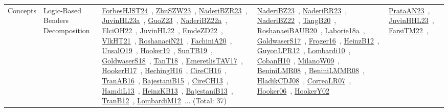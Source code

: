 {\begin{longtable}{lp{3cm}>{\raggedright\arraybackslash}p{6cm}>{\raggedright\arraybackslash}p{6cm}>{\raggedright\arraybackslash}p{8cm}}
Concepts & Logic-Based Benders Decomposition & \href{../works/ForbesHJST24.pdf}{ForbesHJST24}~\cite{ForbesHJST24}, \href{../works/ZhuSZW23.pdf}{ZhuSZW23}~\cite{ZhuSZW23}, \href{../works/NaderiBZR23.pdf}{NaderiBZR23}~\cite{NaderiBZR23}, \href{../works/JuvinHL23a.pdf}{JuvinHL23a}~\cite{JuvinHL23a}, \href{../works/GuoZ23.pdf}{GuoZ23}~\cite{GuoZ23}, \href{../works/NaderiBZ22a.pdf}{NaderiBZ22a}~\cite{NaderiBZ22a}, \href{../works/ElciOH22.pdf}{ElciOH22}~\cite{ElciOH22}, \href{../works/JuvinHL22.pdf}{JuvinHL22}~\cite{JuvinHL22}, \href{../works/EmdeZD22.pdf}{EmdeZD22}~\cite{EmdeZD22}, \href{../works/VlkHT21.pdf}{VlkHT21}~\cite{VlkHT21}, \href{../works/RoshanaeiN21.pdf}{RoshanaeiN21}~\cite{RoshanaeiN21}, \href{../works/FachiniA20.pdf}{FachiniA20}~\cite{FachiniA20}, \href{../works/UnsalO19.pdf}{UnsalO19}~\cite{UnsalO19}, \href{../works/Hooker19.pdf}{Hooker19}~\cite{Hooker19}, \href{../works/SunTB19.pdf}{SunTB19}~\cite{SunTB19}, \href{../works/GoldwaserS18.pdf}{GoldwaserS18}~\cite{GoldwaserS18}, \href{../works/TanT18.pdf}{TanT18}~\cite{TanT18}, \href{../works/EmeretlisTAV17.pdf}{EmeretlisTAV17}~\cite{EmeretlisTAV17}, \href{../works/HookerH17.pdf}{HookerH17}~\cite{HookerH17}, \href{../works/HechingH16.pdf}{HechingH16}~\cite{HechingH16}, \href{../works/CireCH16.pdf}{CireCH16}~\cite{CireCH16}, \href{../works/TranAB16.pdf}{TranAB16}~\cite{TranAB16}, \href{../works/BajestaniB15.pdf}{BajestaniB15}~\cite{BajestaniB15}, \href{../works/CireCH13.pdf}{CireCH13}~\cite{CireCH13}, \href{../works/HamdiL13.pdf}{HamdiL13}~\cite{HamdiL13}, \href{../works/HeinzKB13.pdf}{HeinzKB13}~\cite{HeinzKB13}, \href{../works/BajestaniB13.pdf}{BajestaniB13}~\cite{BajestaniB13}, \href{../works/TranB12.pdf}{TranB12}~\cite{TranB12}, \href{../works/LombardiM12.pdf}{LombardiM12}~\cite{LombardiM12}... (Total: 37) & \href{../works/NaderiBZ23.pdf}{NaderiBZ23}~\cite{NaderiBZ23}, \href{../works/NaderiRR23.pdf}{NaderiRR23}~\cite{NaderiRR23}, \href{../works/NaderiBZ22.pdf}{NaderiBZ22}~\cite{NaderiBZ22}, \href{../works/TangB20.pdf}{TangB20}~\cite{TangB20}, \href{../works/RoshanaeiBAUB20.pdf}{RoshanaeiBAUB20}~\cite{RoshanaeiBAUB20}, \href{../works/Laborie18a.pdf}{Laborie18a}~\cite{Laborie18a}, \href{../works/GoldwaserS17.pdf}{GoldwaserS17}~\cite{GoldwaserS17}, \href{../works/Froger16.pdf}{Froger16}~\cite{Froger16}, \href{../works/HeinzB12.pdf}{HeinzB12}~\cite{HeinzB12}, \href{../works/GuyonLPR12.pdf}{GuyonLPR12}~\cite{GuyonLPR12}, \href{../works/Lombardi10.pdf}{Lombardi10}~\cite{Lombardi10}, \href{../works/CobanH10.pdf}{CobanH10}~\cite{CobanH10}, \href{../works/MilanoW09.pdf}{MilanoW09}~\cite{MilanoW09}, \href{../works/BeniniLMR08.pdf}{BeniniLMR08}~\cite{BeniniLMR08}, \href{../works/BeniniLMMR08.pdf}{BeniniLMMR08}~\cite{BeniniLMMR08}, \href{../works/HladikCDJ08.pdf}{HladikCDJ08}~\cite{HladikCDJ08}, \href{../works/CorreaLR07.pdf}{CorreaLR07}~\cite{CorreaLR07}, \href{../works/Hooker06.pdf}{Hooker06}~\cite{Hooker06}, \href{../works/HookerY02.pdf}{HookerY02}~\cite{HookerY02} & \href{../works/PrataAN23.pdf}{PrataAN23}~\cite{PrataAN23}, \href{../works/JuvinHHL23.pdf}{JuvinHHL23}~\cite{JuvinHHL23}, \href{../works/FarsiTM22.pdf}{FarsiTM22}~\cite{FarsiTM22}, 
\end{longtable}}
